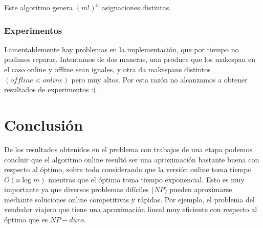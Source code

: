\documentclass[12pt,letterpaper]{article}
\begin{document}
Este algoritmo genera $(m!)^{n}$ asignaciones distintas.

\subsubsection{Experimentos}
Lamentablemente hay problemas en la implementación, que por tiempo no pudimos reparar. Intentamos de dos maneras, una produce que los makespan en el caso online y offline sean iguales, y otra da makespans distintos $(offline < online)$ pero muy altos. Por esta razón no alcanzamos a obtener resultados de experimentos :(.

\section{Conclusión}
De los resultados obtenidos en el problema con trabajos de una etapa podemos concluir que el algoritmo online resultó ser una aproximación bastante buena con respecto al óptimo, sobre todo considerando que la versión online toma tiempo $O(n\log{m})$ mientras que el óptimo toma tiempo exponencial. Esto es muy importante ya que diversos problemas difíciles ($NP$) pueden aproximarse mediante soluciones online competitivas y rápidas. Por ejemplo, el problema del vendedor viajero que tiene una aproximación lineal muy eficiente con respecto al óptimo que es $NP-duro$.

\end{document}
